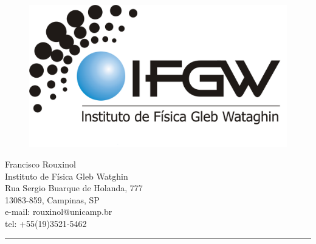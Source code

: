 \documentclass[12pt]{article}
\date{} %
\makeatletter
\numberwithin{equation}{subsection}
\def\vhrulefill#1{\leavevmode\leaders\hrule\@height#1\hfill \kern\z@}
\makeatother
\begin{document}

\setcounter{page}{1} %
\thispagestyle{firstpage}
\begin{figure}
\includegraphics[scale=0.111]{logo-documentos.png}
\end{figure}



\noindent 
\begin{flushright}
\begin{scriptsize}
Francisco Rouxinol \\
Instituto de Física Gleb Watghin\\
Rua Sergio Buarque de Holanda, 777\\
13083-859, Campinas, SP \\
e-mail: rouxinol@unicamp.br\\
tel: +55(19)3521-5462\\
\vhrulefill{1pt} \\ %
\end{scriptsize}
\end{flushright}


\end{document}
